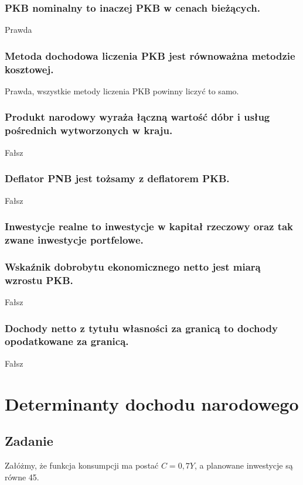 \documentclass[a4paper,12pt]{article}
\let\oldsection\section
\renewcommand\section{\clearpage\oldsection}
\begin{document}
\subsubsection{PKB nominalny to inaczej PKB w cenach bieżących.}
Prawda

\subsubsection{Metoda dochodowa liczenia PKB jest równoważna metodzie kosztowej.}
Prawda, wszystkie metody liczenia PKB powinny liczyć to samo.

\subsubsection{Produkt narodowy wyraża łączną wartość dóbr i usług pośrednich wytworzonych w kraju.}

Fałsz

\subsubsection{Deflator PNB jest tożsamy z deflatorem PKB.}
Fałsz

\subsubsection{Inwestycje realne to inwestycje w kapitał rzeczowy oraz tak zwane inwestycje portfelowe.}

\subsubsection{Wskaźnik dobrobytu ekonomicznego netto jest miarą wzrostu PKB.}
Fałsz

\subsubsection{Dochody netto z tytułu własności za granicą to dochody opodatkowane za granicą.}
Fałsz

\section{Determinanty dochodu narodowego}

\subsection{Zadanie}

Załóżmy, że funkcja konsumpcji ma postać $C = 0,7Y$, a planowane inwestycje są równe 45.
\end{document}
